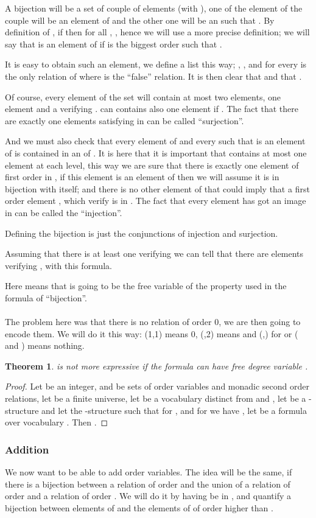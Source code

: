 \documentclass[a4paper,12pt]{article}
\newcommand{\sss}[1]{\subsubsection{#1}}
\newtheorem{theorem}{Theorem}[section]
\theoremstyle{definition}
\begin{document}
A bijection will be a set  of couple of elements 
(with ), one of the element of the couple will be an element of
 and the other one will be an  such that . By
definition of , if  then for all ,
, hence we will use a more precise definition; we
will say that  is an element of  if  is the biggest
order  such that .
 

 It is easy to obtain such an element, we define a list 
 this way; , , and for every
   is the only relation of  where  is the ``false'' relation. It is then clear
 that  and that .

 Of course, every element  of the set  will contain
 at most two elements, one element  and a  verifying
 .  can contains also one element if . The fact
 that there are exactly one elements satisfying  in 
 can be called ``surjection''. 



And we must also check that every element of  and every 
such that  is an element of  is contained in an  of  . It is here that it is important that 
contains at most one element at each level, this way we are sure that
there is exactly one element of first order in , if this
element is an element of  then we will assume it is in bijection
with itself; and there is no other element of  that could imply
that a first order element , which verify  is in . The fact that every element has got an image in 
can be called the ``injection''.

Defining the bijection is just the conjunctions of injection and
surjection.


Assuming that there is at least one  verifying  we can tell
that there are  elements  verifying , with this formula.

Here  means that  is going to be the free
variable of the property used in the formula of ``bijection''.

\paragraph{}The problem here was that there is no relation of order 0,
we are then going to encode them. We will do it this way: (1,1) means
0, (,2) means  and (,) for  or ( and )
means nothing.



\begin{theorem}
  \VO{} is not more expressive if the formula can have free degree
  variable .
\end{theorem}
\begin{proof}
  Let  be an integer, 
  and  be sets of  order variables and
  monadic second order relations, let  be a finite universe, let
   be a vocabulary distinct from  and , let
   be a -structure and let  the
  -structure such that for  , and for  we have , let  be a formula over
  vocabulary . Then .
\end{proof}
\sss{Addition}
We now want to be able to add order variables. The idea will be the
same,  if there is a bijection between a relation of order 
and the union of a relation of order  and a relation of order .
We will do it by having  be in , and quantify a
bijection between elements of  and the elements of 
of order higher than .
\end{document}
